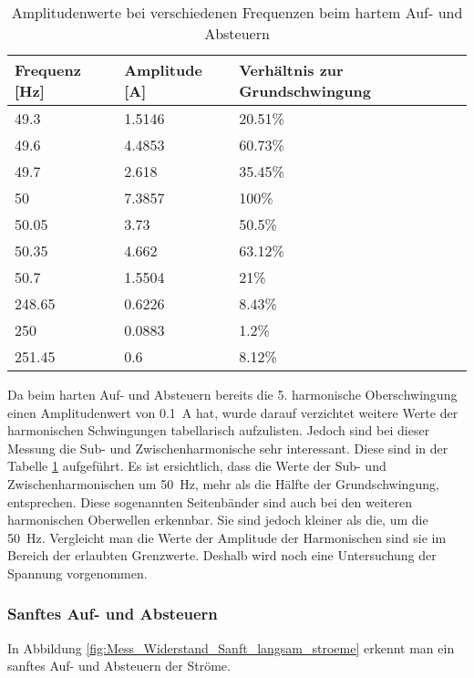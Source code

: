 \begin{table}[ht!]
	\centering
	\begin{tabular}{|l|l|l|}
		\hline
		Frequenz {[}Hz{]} & Amplitude {[}A{]} & Verhältnis zur Grundschwingung	\\ \hline
		49.3              & 1.5146            & 20.51\%							\\ \hline
		49.6              & 4.4853            & 60.73\%							\\ \hline
		49.7              & 2.618             & 35.45\%							\\ \hline
		50                & 7.3857            & 100\%							\\ \hline
		50.05             & 3.73              & 50.5\%							\\ \hline
		50.35             & 4.662             & 63.12\%							\\ \hline
		50.7              & 1.5504            & 21\%							\\ \hline
		248.65            & 0.6226            & 8.43\%							\\ \hline
		250               & 0.0883            & 1.2\%							\\ \hline
		251.45            & 0.6               & 8.12\%							\\ \hline
	\end{tabular}
	\caption{Amplitudenwerte bei verschiedenen Frequenzen beim hartem Auf- und Absteuern}\label{tab:Sanft_stroeme}
\end{table}
Da beim harten Auf- und Absteuern bereits die 5. harmonische Oberschwingung einen Amplitudenwert von  \SI{0.1}{A} hat, wurde darauf verzichtet weitere Werte der harmonischen Schwingungen tabellarisch aufzulisten. Jedoch sind bei dieser Messung die Sub- und Zwischenharmonische sehr interessant. Diese sind in der Tabelle \ref{tab:Sanft_stroeme} aufgeführt. Es ist ersichtlich, dass die Werte der Sub- und Zwischenharmonischen um \SI{50}{Hz}, mehr als die Hälfte der Grundschwingung, entsprechen. Diese sogenannten Seitenbänder sind auch bei den weiteren harmonischen Oberwellen erkennbar. Sie sind jedoch kleiner als die, um die \SI{50}{Hz}. Vergleicht man die Werte der Amplitude der Harmonischen sind sie im Bereich der erlaubten Grenzwerte. Deshalb wird noch eine Untersuchung der Spannung vorgenommen.


\newpage
\subsubsection*{Sanftes Auf- und Absteuern}\label{sec:Sanft_Widerstand_stroeme}
In Abbildung \ref{fig:Mess_Widerstand_Sanft_langsam_stroeme} erkennt man ein sanftes Auf- und Absteuern der Ströme.

